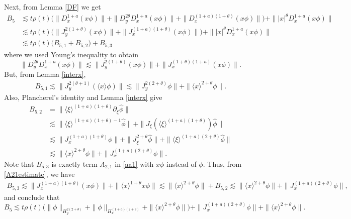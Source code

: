 \documentclass[reqno]{amsart}
\newcommand{\ha}{\hat{\phi}}
\newcommand{\lan}{\langle \xi \rangle}
\newcommand{\lanx}{\langle x \rangle}
\newcommand{\p}{\partial}
\numberwithin{equation}{section}
\begin{document}
Next, from Lemma \ref{DF} we get
\begin{equation*}
\begin{split}
B_5 &\lesssim  t\rho(t) \Big(\|D_x^{1+a}(x\phi)\|+\|D_y^{2\theta} D_x^{1+a}(x\phi)\|+\|D_x^{(1+a)(1+\theta)}(x\phi)\|\Big)+\||x|^\theta D_x^{1+a}(x\phi)\|\\
&\lesssim t\rho(t)\Big(\|J_y^{2(1+\theta)}(x\phi)\|+\|J_x^{(1+a)(1+\theta)}(x\phi)\|\Big)+\||x|^\theta D_x^{1+a}(x\phi)\|\\
&\lesssim t\rho(t) \Big(B_{5,1}+B_{5,2}\Big)+B_{5,3}
\end{split}
\end{equation*}
where we used Young's inequality to obtain
\begin{equation*}
\|D_y^{2\theta} D_x^{1+a}(x\phi)\|\lesssim \|J_y^{2(1+\theta)}(x\phi)\|+\|J_x^{(1+\theta)(1+a)}(x\phi)\|.
\end{equation*}
But, from Lemma \ref{interx},
\begin{equation*}
\begin{split}
B_{5,1}\lesssim \|J_y^{2(\theta+1)}(\lanx \phi)\|
\lesssim \|J_y^{2(2+\theta)}\phi\|+\|\lanx^{2+\theta}\phi\|.
\end{split}
\end{equation*}
Also, Plancherel's identity and Lemma \ref{interx} give
\begin{equation*}
\begin{split}
B_{5,2}&=\|\lan^{(1+a)(1+\theta)}\p_\xi \ha\|\\
&\lesssim \|\lan^{(1+a)(1+\theta)-1}\ha\|+\|J_\xi (\lan^{(1+a)(1+\theta)})\ha\|\\
&\lesssim \|J_x^{(1+a)(1+\theta)}\phi\|+\|J_\xi^{2+\theta}\ha\|+\|\lan^{(1+a)(2+\theta)}\ha\|\\
&\lesssim \|\lanx^{2+\theta}\phi\|+\|J_x^{(1+a)(2+\theta)}\phi\|.
\end{split}
\end{equation*}
Note that $B_{5,3}$ is exactly term $A_{2,1}$ in \eqref{aa1} with $x\phi$ instead of $\phi$. Thus, from \eqref{A21estimate}, we have
\begin{equation*}
\begin{split}
B_{5,3}\lesssim \|J_x^{(1+a)(1+\theta)}(x\phi)\|+\|\lanx^{1+\theta}x\phi\|
\lesssim \|\lanx^{2+\theta}\phi\|+B_{5,2}\lesssim \|\lanx^{2+\theta}\phi\|+\|J_x^{(1+a)(2+\theta)}\phi\|,
\end{split}
\end{equation*}
and conclude that
\begin{equation}\label{B5estimate}
B_5\lesssim t\rho(t)\Big(\|\phi\|_{H^{2(2+\theta)}_y}+\| \phi\|_{H^{(1+a)(2+\theta)}_x}+\|\lanx^{2+\theta}\phi\|\Big)+\|J_x^{(1+a)(2+\theta)}\phi\|+\|\lanx^{2+\theta}\phi\|.
\end{equation}
\end{document}
